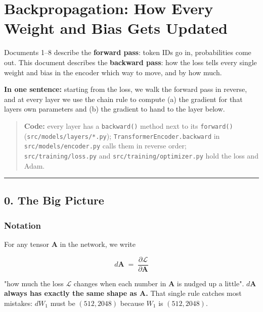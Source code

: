 \documentclass[11pt,a4paper,oneside]{report}
\begin{document}

\chapter{Backpropagation: How Every Weight and Bias Gets Updated}\label{backpropagation-how-every-weight-and-bias-gets-updated}

Documents 1--8 describe the \textbf{forward pass}: token IDs go in, probabilities come out. This document describes the \textbf{backward pass}: how the loss tells every single weight and bias in the encoder which way to move, and by how much.

\textbf{In one sentence:} starting from the loss, we walk the forward pass in reverse, and at every layer we use the chain rule to compute (a) the gradient for that layer\textquotesingle s own parameters and (b) the gradient to hand to the layer below.

\begin{quote}
\textbf{Code:} every layer has a \texttt{backward()} method next to its \texttt{forward()} (\texttt{src/\allowbreak{}models/\allowbreak{}layers/\allowbreak{}*.\allowbreak{}py}); \texttt{TransformerEncoder.\allowbreak{}backward} in \texttt{src/\allowbreak{}models/\allowbreak{}encoder.\allowbreak{}py} calls them in reverse order; \texttt{src/\allowbreak{}training/\allowbreak{}loss.\allowbreak{}py} and \texttt{src/\allowbreak{}training/\allowbreak{}optimizer.\allowbreak{}py} hold the loss and Adam.
\end{quote}

\begin{center}\rule{0.5\linewidth}{0.5pt}\end{center}

\section{0. The Big Picture}\label{0-the-big-picture}

\subsection{Notation}\label{notation}

For any tensor \(\mathbf{A}\) in the network, we write

\[d\mathbf{A} \;=\; \frac{\partial \mathcal{L}}{\partial \mathbf{A}}\]

"how much the loss \(\mathcal{L}\) changes when each number in \(\mathbf{A}\) is nudged up a little". \textbf{\(d\mathbf{A}\) always has exactly the same shape as \(\mathbf{A}\).} That single rule catches most mistakes: \(dW_1\) must be \((512, 2048)\) because \(W_1\) is \((512, 2048)\).
\end{document}
